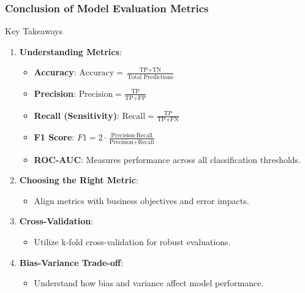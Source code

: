 \documentclass{beamer}
\begin{document}
\begin{frame}[fragile]
    \frametitle{Conclusion of Model Evaluation Metrics}
    \begin{block}{Key Takeaways}
        \begin{enumerate}
            \item \textbf{Understanding Metrics}:
                \begin{itemize}
                    \item \textbf{Accuracy}: \( \text{Accuracy} = \frac{\text{TP} + \text{TN}}{\text{Total Predictions}} \) 
                    \item \textbf{Precision}: \( \text{Precision} = \frac{\text{TP}}{\text{TP} + \text{FP}} \)
                    \item \textbf{Recall (Sensitivity)}: \( \text{Recall} = \frac{\text{TP}}{\text{TP} + \text{FN}} \)
                    \item \textbf{F1 Score}: \( F1 = 2 \cdot \frac{\text{Precision} \cdot \text{Recall}}{\text{Precision} + \text{Recall}} \)
                    \item \textbf{ROC-AUC}: Measures performance across all classification thresholds.
                \end{itemize}
            \item \textbf{Choosing the Right Metric}:
                \begin{itemize}
                    \item Align metrics with business objectives and error impacts.
                \end{itemize}
            \item \textbf{Cross-Validation}:
                \begin{itemize}
                    \item Utilize k-fold cross-validation for robust evaluations.
                \end{itemize}
            \item \textbf{Bias-Variance Trade-off}:
                \begin{itemize}
                    \item Understand how bias and variance affect model performance.
                \end{itemize}
        \end{enumerate}
    \end{block}
\end{frame}
\end{document}
